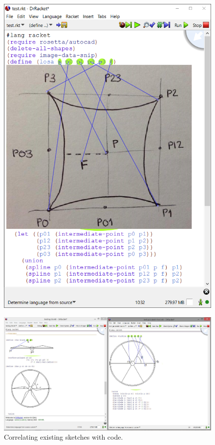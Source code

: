 \begin{figure}[h]
\begin{minipage}[t]{.495\textwidth}
  \includegraphics[width=1\linewidth]{images/losa}
  \label{fig:losa1}
\end{minipage}
\end{figure}

\begin{figure}[!h]
  \centering
  \includegraphics[width=1\textwidth]{images/turbine}
    \caption{Correlating existing sketches with code.}
  \label{fig:turbine}
\end{figure}

